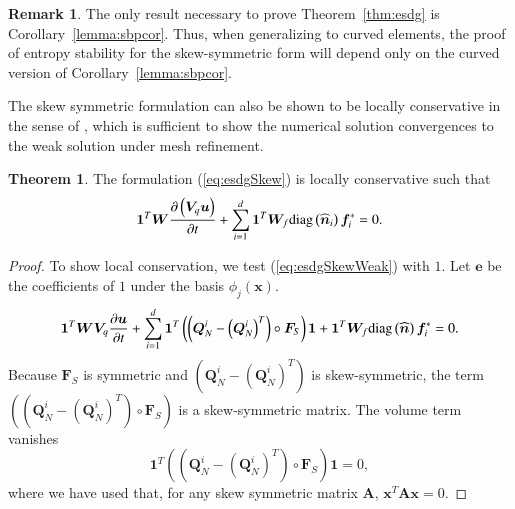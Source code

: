 \documentclass[preprint,10pt]{elsarticle}
\theoremstyle{definition}
\theoremstyle{lemma}
\theoremstyle{corollary}
\newtheorem*{remark}{Remark}
\theoremstyle{theorem}
\newtheorem{theorem}{Theorem}
\theoremstyle{assumption}
\renewcommand{\hat}[1]{\widehat{#1}}
\newcommand{\pd}[2]{\frac{\partial#1}{\partial#2}}
\newcommand{\LRp}[1]{\left( #1 \right)}
\newcommand{\diag}[1]{{\rm diag}\LRp{#1}}
\begin{document}
\begin{remark}
The only result necessary to prove Theorem~\ref{thm:esdg} is Corollary~\ref{lemma:sbpcor}.  Thus, when generalizing to curved elements, the proof of entropy stability for the skew-symmetric form will depend only on the curved version of Corollary~\ref{lemma:sbpcor}.
\end{remark}

The skew symmetric formulation can also be shown to be locally conservative in the sense of \cite{shi2017local}, which is sufficient to show the numerical solution convergences to the weak solution under mesh refinement.  
\begin{theorem}
The formulation (\ref{eq:esdgSkew}) is locally conservative such that
\begin{align}
\bm{1}^T\bm{W}\pd{\LRp{\bm{V}_q\bm{u}}}{t} + \sum_{i=1}^d\bm{1}^T\bm{W}_f \diag{\hat{\bm{n}}_i}\bm{f}_i^* = 0. 
\end{align}
\end{theorem}
\begin{proof}
To show local conservation, we test (\ref{eq:esdgSkewWeak}) with $1$.  Let $\bm{e}$ be the coefficients of $1$ under the basis $\phi_j(\bm{x})$.
\begin{align}
\bm{1}^T\bm{W}\bm{V}_q\pd{\bm{u}}{t} + \sum_{i=1}^d
\bm{1}^T
\LRp{\LRp{\bm{Q}^i_N - \LRp{\bm{Q}^i_N}^T} \circ \bm{F}_S}\bm{1} + \bm{1}^T\bm{W}_f \diag{\hat{\bm{n}}}\bm{f}_i^* = 0. 
\end{align}
Because $\bm{F}_S$ is symmetric and $\LRp{\bm{Q}^i_N - \LRp{\bm{Q}^i_N}^T}$ is skew-symmetric, the term $\LRp{\LRp{\bm{Q}^i_N - \LRp{\bm{Q}^i_N}^T} \circ \bm{F}_S}$ is a skew-symmetric matrix.  The volume term vanishes
\[
\bm{1}^T\LRp{\LRp{\bm{Q}^i_N - \LRp{\bm{Q}^i_N}^T} \circ \bm{F}_S}\bm{1} = 0,
\]
where we have used that, for any skew symmetric matrix $\bm{A}$, $\bm{x}^T\bm{A}\bm{x} = 0$.
\end{proof}
\end{document}
